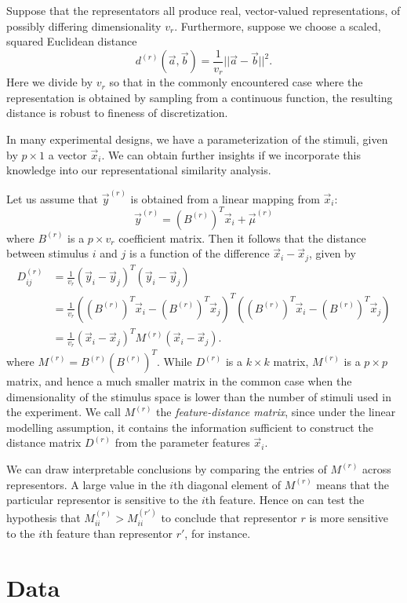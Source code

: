 \documentclass[12pt]{article}
\begin{document}
Suppose that the representators all produce real, vector-valued representations, of possibly differing dimensionality $v_r$.  Furthermore, suppose we choose a scaled, squared Euclidean distance
\[
d^{(r)}(\vec{a},\vec{b}) = \frac{1}{v_r} ||\vec{a} - \vec{b}||^2.
\]
Here we divide by $v_r$ so that in the commonly encountered case where the representation is obtained by
sampling from a continuous function, the resulting distance is robust to fineness of discretization.

In many experimental designs, we have a parameterization of the stimuli, given by $p \times 1$ a vector $\vec{x}_i$.
We can obtain further insights if we incorporate this knowledge into our representational similarity analysis.

Let us assume that $\vec{y}^{(r)}$ is obtained from a linear mapping from $\vec{x}_i$:
\[
\vec{y}^{(r)} = (B^{(r)})^T \vec{x}_i  + \vec{\mu}^{(r)}
\]
where $B^{(r)}$ is a $p \times v_r$ coefficient matrix.
Then it follows that the distance between stimulus $i$ and $j$ is a function of the difference $\vec{x}_i-\vec{x}_j$, given by
\begin{align*}
D^{(r)}_{ij} &= \frac{1}{v_r} (\vec{y}_i - \vec{y}_j)^T( \vec{y}_i - \vec{y}_j) 
\\&= \frac{1}{v_r} ((B^{(r)})^T\vec{x}_i - (B^{(r)})^T\vec{x}_j)^T((B^{(r)})^T \vec{x}_i - (B^{(r)})^T\vec{x}_j) 
\\&= \frac{1}{v_r} (\vec{x}_i - \vec{x}_j)^T M^{(r)} (\vec{x}_i-\vec{x}_j).
\end{align*}
where $M^{(r)} = B^{(r)} (B^{(r)})^T$.
While $D^{(r)}$ is a $k \times k$ matrix,
$M^{(r)}$ is a $p \times p$ matrix, and hence a much smaller matrix in the common case when
the dimensionality of the stimulus space is lower than the number of stimuli used in the experiment.
We call $M^{(r)}$ the \emph{feature-distance matrix}, since under the linear modelling assumption,
it contains the information sufficient to construct the distance matrix $D^{(r)}$ from the parameter features $\vec{x}_i$.

We can draw interpretable conclusions by comparing the entries of $M^{(r)}$ across representors.
A large value in the $i$th diagonal element of $M^{(r)}$ means that the particular representor is sensitive to the $i$th feature.  Hence on can test the hypothesis that $M^{(r)}_{ii} > M^{(r')}_{ii}$ to conclude that representor $r$ is more sensitive to the $i$th feature than representor $r'$, for instance.

\section{Data}
\end{document}
